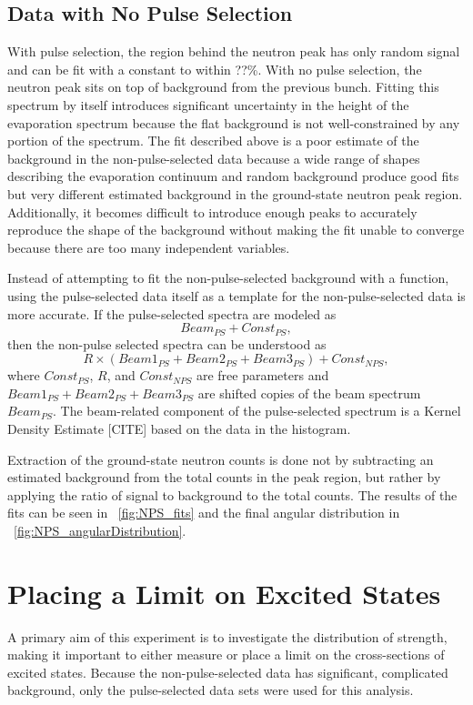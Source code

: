 \subsection{Data with No Pulse Selection}
With pulse selection, the region behind the neutron peak has only random signal and can be fit with a constant to within ??\%.  With no pulse selection, the neutron peak sits on top of background from the previous bunch.  Fitting this spectrum by itself introduces significant uncertainty in the height of the evaporation spectrum because the flat background is not well-constrained by any portion of the spectrum.  The fit described above is a poor estimate of the background in the non-pulse-selected data because a wide range of shapes describing the evaporation continuum and random background produce good fits but very different estimated background in the ground-state neutron peak region.  Additionally, it becomes difficult to introduce enough peaks to accurately reproduce the shape of the background without making the fit unable to converge because there are too many independent variables. 

Instead of attempting to fit the non-pulse-selected background with a function, using the pulse-selected data itself as a template for the non-pulse-selected data is more accurate.  If the pulse-selected spectra are modeled as
\begin{equation}
Beam_{PS} + Const_{PS},
\end{equation}
then the non-pulse selected spectra can be understood as
\begin{equation}
R\times (Beam1_{PS}+Beam2_{PS}+Beam3_{PS}) + Const_{NPS},
\end{equation}
where $Const_{PS}$, $R$, and $Const_{NPS}$ are free parameters and $Beam1_{PS}+Beam2_{PS}+Beam3_{PS}$ are shifted copies of the beam spectrum $Beam_{PS}$.  The beam-related component of the pulse-selected spectrum is a Kernel Density Estimate [CITE] based on the data in the histogram.  

Extraction of the ground-state neutron counts is done not by subtracting an estimated background from the total counts in the peak region, but rather by applying the ratio of signal to background to the total counts.  The results of the fits can be seen in {\fig}~\ref{fig:NPS_fits} and the final angular distribution in {\fig}~\ref{fig:NPS_angularDistribution}.


\section{Placing a Limit on Excited \zp States}

A primary aim of this experiment is to investigate the distribution of \zp strength, making it important to either measure or place a limit on the cross-sections of excited \zp states.  Because the non-pulse-selected data has significant, complicated background, only the pulse-selected data sets were used for this analysis.

